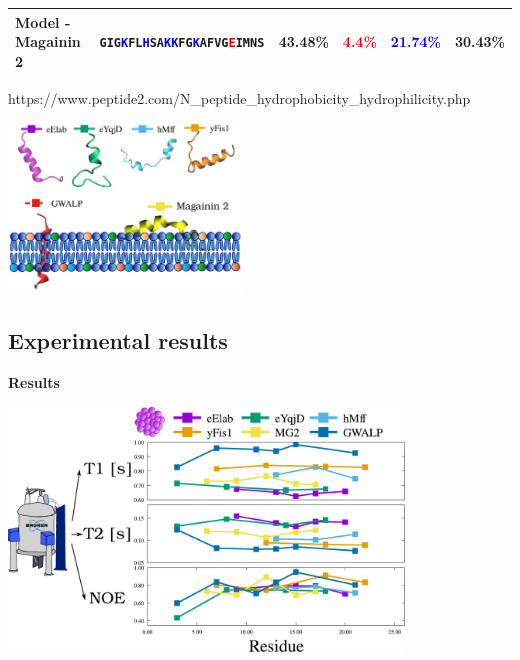 \documentclass{beamer}
\begin{document}
\begin{frame}
{\begin{tabular}{l l r r r r}
Model - Magainin 2 & \texttt{\textcolor{OliveGreen}{GIG}\textcolor{blue}{K}\textcolor{OliveGreen}{FL}\textcolor{blue}{H}S\textcolor{OliveGreen}{A}\textcolor{blue}{KK}\textcolor{OliveGreen}{FG}\textcolor{blue}{K}\textcolor{OliveGreen}{AFVG}\textcolor{red}{E}\textcolor{OliveGreen}{IM}NS } & \textcolor{OliveGreen}{43.48\%} & \textcolor{red}{4.4\%} & \textcolor{blue}{21.74\%} & 30.43\% \\

\hline

\end{tabular}

}


{\tiny https://www.peptide2.com/N\_peptide\_hydrophobicity\_hydrophilicity.php}

\vspace{0.2cm}

\includegraphics[height=4.5cm]{tail0.pdf}

\end{frame}


\subsection{Experimental results}

\begin{frame}
\begin{center}
\Large{\centering
\textbf{Results} \\}

\vspace{0.5cm}

\includegraphics[height=6.5cm]{relax_exp1.pdf}
\end{center}
\end{frame}
\end{document}
